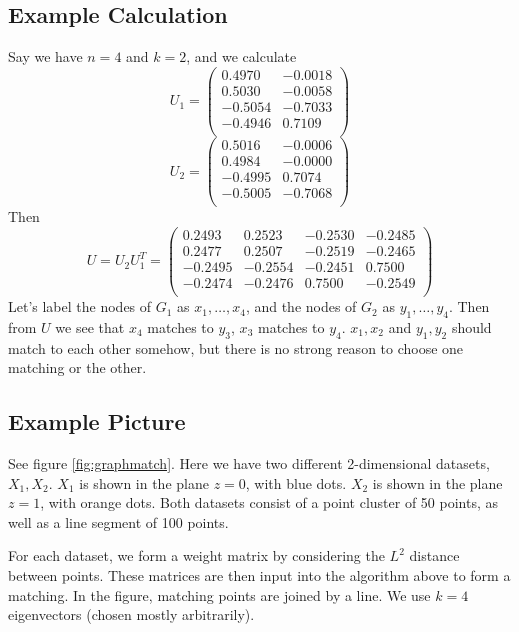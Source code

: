 \documentclass[12pt]{article}
\begin{document}
\subsection*{Example Calculation}
Say we have $n=4$ and $k=2$, and we calculate
\[U_1 = \begin{pmatrix}
  0.4970 &  -0.0018\\
  0.5030 &  -0.0058\\
 -0.5054 &  -0.7033\\
 -0.4946 &   0.7109\\
 \end{pmatrix}
\]
\[U_2 = \begin{pmatrix}
  0.5016 &  -0.0006 \\
  0.4984 &  -0.0000 \\
 -0.4995 &   0.7074 \\
 -0.5005 &  -0.7068 \\
 \end{pmatrix}
\]
Then \[U = U_2 U_1^T = \begin{pmatrix}
    0.2493 &   0.2523 &  -0.2530 &  -0.2485\\
    0.2477 &   0.2507 &  -0.2519 &  -0.2465\\
   -0.2495 &  -0.2554 &  -0.2451 &   0.7500\\
   -0.2474 &  -0.2476 &   0.7500 &  -0.2549\\
 \end{pmatrix}
\]
Let's label the nodes of $G_1$ as $x_1,\ldots,x_4$, and the nodes of $G_2$ as $y_1,\ldots,y_4$. Then from $U$ we see that $x_4$ matches to $y_3$, $x_3$ matches to $y_4$. $x_1,x_2$ and $y_1,y_2$ should match to each other somehow, but there is no strong reason to choose one matching or the other.

\subsection*{Example Picture}

See figure \ref{fig:graphmatch}. Here we have two different 2-dimensional datasets, $X_1,X_2$. $X_1$ is shown in the plane $z=0$, with blue dots. $X_2$ is shown in the plane $z=1$, with orange dots. Both datasets consist of a point cluster of 50 points, as well as a line segment of 100 points.

For each dataset, we form a weight matrix by considering the $L^2$ distance between points. These matrices are then input into the algorithm above to form a matching. In the figure, matching points are joined by a line. We use $k=4$ eigenvectors (chosen mostly arbitrarily).
\end{document}
